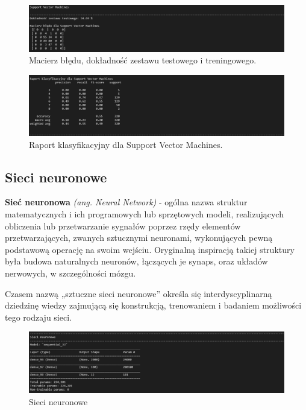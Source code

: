\documentclass{article}
\begin{document}
\begin{figure}[!htb]
\centering
\includegraphics[width=\textwidth]{image/SVM.png}
\caption{Macierz błędu, dokładność zestawu testowego i treningowego.}
\end{figure}

\begin{figure}[!htb]
\centering
\includegraphics[width=\textwidth]{image/raport_SVM.png}
\caption{Raport klasyfikacyjny dla Support Vector Machines.}
\end{figure}
\newpage
\subsection{Sieci neuronowe}

\textbf{Sieć neuronowa} \emph{(ang. Neural Network)} - ogólna nazwa struktur matematycznych i ich programowych lub sprzętowych modeli, realizujących obliczenia lub przetwarzanie sygnałów poprzez rzędy elementów przetwarzających, zwanych sztucznymi neuronami, wykonujących pewną podstawową operację na swoim wejściu. Oryginalną inspiracją takiej struktury była budowa naturalnych neuronów, łączących je synaps, oraz układów nerwowych, w szczególności mózgu.

Czasem nazwą „sztuczne sieci neuronowe” określa się interdyscyplinarną dziedzinę wiedzy zajmującą się konstrukcją, trenowaniem i badaniem możliwości tego rodzaju sieci.

\begin{figure}[!htb]
\centering
\includegraphics[width=\textwidth]{image/SN1.png}
\caption{Sieci neuronowe}
\end{figure}
\end{document}
